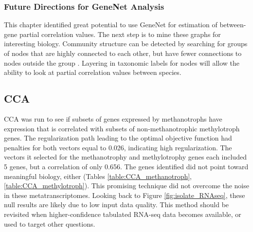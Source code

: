 \subsubsection{Future Directions for GeneNet Analysis}

This chapter identified great potential to use GeneNet for estimation of between-gene partial correlation values.
The next step is to mine these graphs for interesting biology.
Community structure can be detected by searching for groups of nodes that are highly connected to each other, but have fewer connections to nodes outside the group \cite{girvan2002}.
Layering in taxonomic labels for nodes will allow the ability to look at partial correlation values between species.



\subsection{CCA}

CCA was run to see if subsets of genes expressed by methanotrophs have expression that is correlated with subsets of non-methanotrophic methylotroph genes.
The regularization path leading to the optimal objective function had penalties for both vectors equal to 0.026, indicating high regularization.
The vectors it selected for the methanotrophy and methylotrophy genes each included 5 genes, but a correlation of only 0.656.
The genes identified did not point toward meaningful biology, either (Tables \ref{table:CCA_methanotroph}, \ref{table:CCA_methylotroph}).
This promising technique did not overcome the noise in these metatranscriptomes.
Looking back to Figure \ref{fig:isolate_RNAseq}, these null results are likely due to low input data quality.
This method should be revisited when higher-confidence tabulated RNA-seq data becomes available, or used to target other questions.

